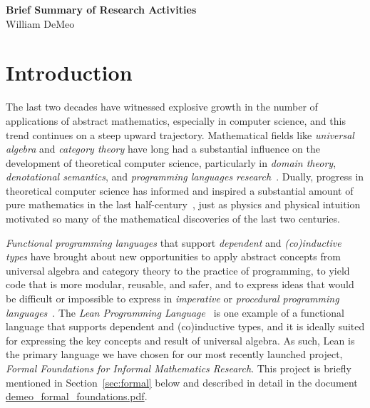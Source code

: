 \begin{center}
  {\bf Brief Summary of Research Activities}\\[4pt]
  William DeMeo
\end{center}


\vskip5mm

\section{Introduction}
The last two decades have witnessed explosive growth in the number of applications of abstract mathematics, especially in computer science, and this trend continues on a steep upward trajectory. Mathematical fields like \emph{universal algebra} and \emph{category theory} have long had a substantial influence on the development of theoretical computer science, particularly in \emph{domain theory}, \emph{denotational semantics}, and \emph{programming languages research}~\cite{MR2328298,MR1249550}. Dually, progress in theoretical computer science has informed and inspired a substantial amount of pure mathematics in the last half-century~\cite{MR3662915,MR3725758,MR2765040,MR3233442,MR1321662,MR1249550}, just as physics and physical intuition motivated so many of the mathematical discoveries of the last two centuries.  

\emph{Functional programming languages} that support \emph{dependent} and \emph{(co)inductive types} have brought about new opportunities to apply abstract concepts from universal algebra and category theory to the practice of programming, to yield code that is more modular, reusable, and safer, and to express ideas that would be difficult or impossible to express in \emph{imperative} or \emph{procedural programming languages}~\cite[Chs. 5 \& 10]{baueroplss:2018,hughes:1989,chiusano:2014}. 
The \emph{Lean Programming Language}~\cite{lean} is one example of a functional language that supports dependent and (co)inductive types, and it is ideally suited for expressing the key concepts and result of universal algebra.  As such, Lean is the primary language we have chosen for our most recently launched project, \emph{Formal Foundations for Informal Mathematics Research}.  This project is briefly mentioned in Section~\ref{sec:formal} below and described in detail in the document 
\href{https://github.com/williamdemeo/job-app/blob/master/research/demeo_formal_foundations.pdf}{demeo\_formal\_foundations.pdf}.

